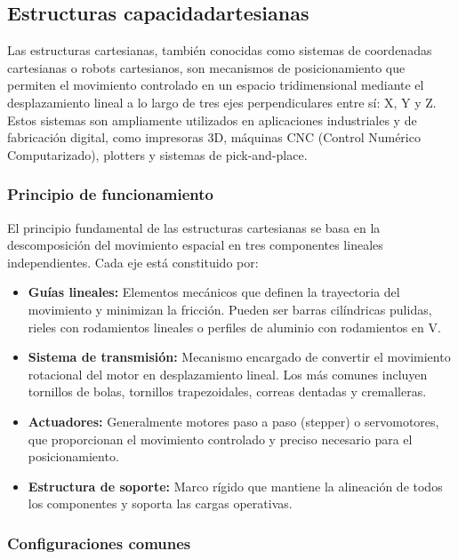 \subsection{Estructuras capacidadartesianas}

Las estructuras cartesianas, también conocidas como sistemas de coordenadas cartesianas o robots cartesianos, son mecanismos de posicionamiento que permiten el movimiento controlado en un espacio tridimensional mediante el desplazamiento lineal a lo largo de tres ejes perpendiculares entre sí: X, Y y Z. Estos sistemas son ampliamente utilizados en aplicaciones industriales y de fabricación digital, como impresoras 3D, máquinas CNC (Control Numérico Computarizado), plotters y sistemas de pick-and-place.

\subsubsection{Principio de funcionamiento}

El principio fundamental de las estructuras cartesianas se basa en la descomposición del movimiento espacial en tres componentes lineales independientes. Cada eje está constituido por:

\begin{itemize}[label=$\bullet$]
    \item \textbf{Guías lineales:} Elementos mecánicos que definen la trayectoria del movimiento y minimizan la fricción. Pueden ser barras cilíndricas pulidas, rieles con rodamientos lineales o perfiles de aluminio con rodamientos en V.

    \item \textbf{Sistema de transmisión:} Mecanismo encargado de convertir el movimiento rotacional del motor en desplazamiento lineal. Los más comunes incluyen tornillos de bolas, tornillos trapezoidales, correas dentadas y cremalleras.

    \item \textbf{Actuadores:} Generalmente motores paso a paso (stepper) o servomotores, que proporcionan el movimiento controlado y preciso necesario para el posicionamiento.

    \item \textbf{Estructura de soporte:} Marco rígido que mantiene la alineación de todos los componentes y soporta las cargas operativas.
\end{itemize}

\subsubsection{Configuraciones comunes}

